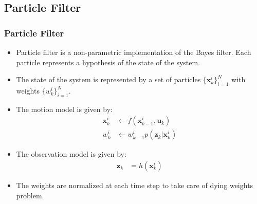 \documentclass{beamer}
\begin{document}
\subsection{Particle Filter}
\begin{frame}
\frametitle{Particle Filter}
\begin{itemize}
    \item Particle filter is a non-parametric implementation of the Bayes filter. Each particle represents a hypothesis of the state of the system.
    \item The state of the system is represented by a set of particles $\{\mathbf{x}^i_k\}_{i=1}^N$ with weights $\{w^i_k\}_{i=1}^N$.
    \item The motion model is given by:
    \begin{align*}
        \mathbf{x}^i_k &\leftarrow f(\mathbf{x}^i_{k-1}, \mathbf{u}_k) \\
        w^i_k &\leftarrow w^i_{k-1} p(\mathbf{z}_k | \mathbf{x}^i_k)
    \end{align*}
    \item The observation model is given by:
    \begin{align*}
        \mathbf{z}_k &= h(\mathbf{x}^i_k)
    \end{align*}
    \item The weights are normalized at each time step to take care of dying weights problem.
\end{itemize}
\end{frame}
\end{document}
